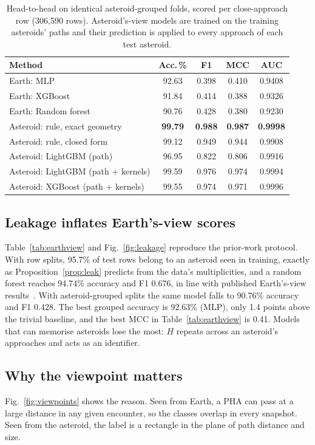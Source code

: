 \documentclass[make,article,submit,moreauthors]{Definitions/mdpi}
\begin{document}
\begin{table}[t]
\centering
\footnotesize
\caption{Head-to-head on identical asteroid-grouped folds, scored per close-approach row (306,590 rows). Asteroid's-view models are trained on the training asteroids' paths and their prediction is applied to every approach of each test asteroid.}
\label{tab:samefolds}
\setlength{\tabcolsep}{2.2pt}
\begin{tabular}{@{}lcccc@{}}
\toprule
Method & Acc.\,\% & F1 & MCC & AUC \\
\midrule
Earth: MLP & 92.63 & 0.398 & 0.410 & 0.9408 \\
Earth: XGBoost & 91.84 & 0.414 & 0.388 & 0.9326 \\
Earth: Random forest & 90.76 & 0.428 & 0.380 & 0.9230 \\
\midrule
Asteroid: rule, exact geometry & \textbf{99.79} & \textbf{0.988} & \textbf{0.987} & \textbf{0.9998} \\
Asteroid: rule, closed form & 99.12 & 0.949 & 0.944 & 0.9908 \\
Asteroid: LightGBM (path) & 96.95 & 0.822 & 0.806 & 0.9916 \\
Asteroid: LightGBM (path + kernels) & 99.59 & 0.976 & 0.974 & 0.9994 \\
Asteroid: XGBoost (path + kernels) & 99.55 & 0.974 & 0.971 & 0.9996 \\
\bottomrule
\end{tabular}
\end{table}


\subsection{Leakage inflates Earth's-view scores}
Table~\ref{tab:earthview} and Fig.~\ref{fig:leakage} reproduce the prior-work protocol. With row splits, 95.7\% of test rows belong to an asteroid seen in training, exactly as Proposition~\ref{prop:leak} predicts from the data's multiplicities, and a random forest reaches 94.74\% accuracy and F1 0.676, in line with published Earth's-view results~\cite{mclemore2022,malakouti2023}. With asteroid-grouped splits the same model falls to 90.76\% accuracy and F1 0.428. The best grouped accuracy is 92.63\% (MLP), only 1.4 points above the trivial baseline, and the best MCC in Table~\ref{tab:earthview} is 0.41. Models that can memorise asteroids lose the most: $H$ repeats across an asteroid's approaches and acts as an identifier.

\subsection{Why the viewpoint matters}
Fig.~\ref{fig:viewpoints} shows the reason. Seen from Earth, a PHA can pass at a large distance in any given encounter, so the classes overlap in every snapshot. Seen from the asteroid, the label is a rectangle in the plane of path distance and size.
\end{document}
